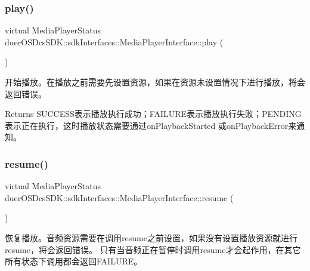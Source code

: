 \subsubsection{\texorpdfstring{play()}{play()}}
{\footnotesize\ttfamily virtual Media\+Player\+Status duer\+O\+S\+Dcs\+S\+D\+K\+::sdk\+Interfaces\+::\+Media\+Player\+Interface\+::play (\begin{DoxyParamCaption}{ }\end{DoxyParamCaption})\hspace{0.3cm}{\ttfamily [pure virtual]}}



开始播放。在播放之前需要先设置资源，如果在资源未设置情况下进行播放，将会返回错误。 

\begin{DoxyReturn}{Returns}
{\ttfamily S\+U\+C\+C\+E\+S\+S表示播放执行成功；\+F\+A\+I\+L\+U\+R\+E表示播放执行失败；\+P\+E\+N\+D\+I\+N\+G表示正在执行，这时播放状态需要通过on\+Playback\+Started} 或on\+Playback\+Error来通知。 
\end{DoxyReturn}
\mbox{\label{classduerOSDcsSDK_1_1sdkInterfaces_1_1MediaPlayerInterface_affeabe3384e46924a96cd146e3c8dba0}} 
\subsubsection{\texorpdfstring{resume()}{resume()}}
{\footnotesize\ttfamily virtual Media\+Player\+Status duer\+O\+S\+Dcs\+S\+D\+K\+::sdk\+Interfaces\+::\+Media\+Player\+Interface\+::resume (\begin{DoxyParamCaption}{ }\end{DoxyParamCaption})\hspace{0.3cm}{\ttfamily [pure virtual]}}



恢复播放。音频资源需要在调用resume之前设置，如果没有设置播放资源就进行resume，将会返回错误。 只有当音频正在暂停时调用resume才会起作用，在其它所有状态下调用都会返回\+F\+A\+I\+L\+U\+R\+E。 

